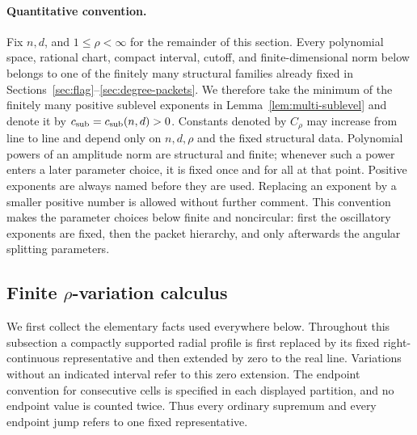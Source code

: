 \documentclass[11pt]{article}
\numberwithin{equation}{section}
\theoremstyle{remark}
\theoremstyle{definition}
\begin{document}
\paragraph{Quantitative convention.}
Fix $n,d$, and $1\le\rho<\infty$ for the remainder of this section.
Every polynomial space, rational chart, compact interval, cutoff, and
finite-dimensional norm below belongs to one of the finitely many structural
families already fixed in Sections~\ref{sec:flag}--\ref{sec:degree-packets}.
We therefore take the minimum of the finitely many positive sublevel
exponents in Lemma~\ref{lem:multi-sublevel} and denote it by
$c_{\rm sub}=c_{\rm sub}(n,d)>0$. Constants denoted by $C_\rho$ may increase from line to line and
depend only on $n,d,\rho$ and the fixed structural data.  Polynomial powers
of an amplitude norm are structural and finite; whenever such a power enters
a later parameter choice, it is fixed once and for all at that point.
Positive exponents are always named before they are used. Replacing an
exponent by a smaller positive number is allowed without further comment. This convention makes the
parameter choices below finite and noncircular: first the oscillatory
exponents are fixed, then the packet hierarchy, and only afterwards the
angular splitting parameters.

\subsection{Finite \texorpdfstring{$\rho$}{rho}-variation calculus}

We first collect the elementary facts used everywhere below.
Throughout this subsection a compactly supported radial profile is first
replaced by its fixed right-continuous representative and then extended by
zero to the real line.  Variations without an indicated interval refer to
this zero extension.  The endpoint convention for consecutive cells is
specified in each displayed partition, and no endpoint value is counted
twice.  Thus every ordinary supremum and every endpoint jump refers to one
fixed representative.
\end{document}
